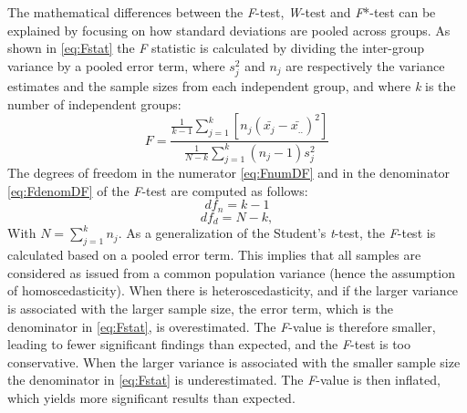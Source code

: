 \documentclass[man,floatsintext]{apa6}
\begin{document}
The mathematical differences between the \emph{F}-test, \emph{W}-test and \emph{F}*-test can be explained by focusing on how standard deviations are pooled across groups. As shown in \eqref{eq:Fstat} the \emph{F} statistic is calculated by dividing the inter-group variance by a pooled error term, where \(s_{j}^2\) and \(n_{j}\) are respectively the variance estimates and the sample sizes from each independent group, and where \emph{k} is the number of independent groups:
\begin{equation} 
F=\frac{\frac{1}{k-1}\sum_{j=1}^k [n_j(\bar{x_{j}}-\bar{x_{..}})^2]}{\frac{1}{N-k}\sum_{j=1}^k(n_j-1)s_j^2}
\label{eq:Fstat}
\end{equation}
The degrees of freedom in the numerator \eqref{eq:FnumDF} and in the denominator \eqref{eq:FdenomDF} of the \emph{F}-test are computed as follows:
\begin{equation} 
df_n=k-1
\label{eq:FnumDF}
\end{equation}
\begin{equation} 
df_d= N-k, 
\label{eq:FdenomDF}
\end{equation}
With \(N=\sum_{j=1}^k n_j\). As a generalization of the Student's \emph{t}-test, the \emph{F}-test is calculated based on a pooled error term. This implies that all samples are considered as issued from a common population variance (hence the assumption of homoscedasticity). When there is heteroscedasticity, and if the larger variance is associated with the larger sample size, the error term, which is the denominator in \eqref{eq:Fstat}, is overestimated. The \emph{F}-value is therefore smaller, leading to fewer significant findings than expected, and the \emph{F}-test is too conservative. When the larger variance is associated with the smaller sample size the denominator in \eqref{eq:Fstat} is underestimated. The \emph{F}-value is then inflated, which yields more significant results than expected.
\end{document}
